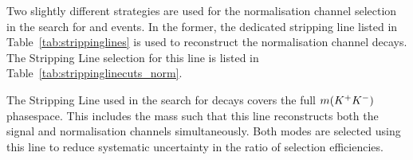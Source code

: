 

Two slightly different strategies are used for the normalisation channel selection in the search for \decay{\Bp}{\Dsp\phiz} and \decay{\Bp}{\Dsp\Kp\Km} events.
In the former, the dedicated \decay{\Bp}{\Dsp\Dzb} stripping line listed in Table~\ref{tab:strippinglines} is used to reconstruct the normalisation channel decays.
The Stripping Line selection for this line is listed in Table~\ref{tab:strippinglinecuts_norm}.

The Stripping Line used in the search for \decay{\Bp}{\Dsp\Kp\Km} decays covers the full $m({{K}^+}{{K}^-})$ phasespace. This includes the \Dzb mass such that this line reconstructs both the signal and normalisation channels simultaneously. 
Both modes are selected using this line to reduce systematic uncertainty in the ratio of selection efficiencies.

